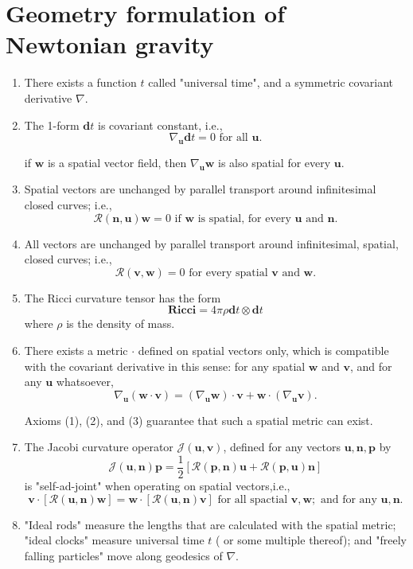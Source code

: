 \section{Geometry formulation of Newtonian gravity}
\begin{enumerate}
\item There exists a function $t$ called "universal time", and a symmetric covariant derivative $\nabla$.
\item The 1-form $\bm{d}t$ is covariant constant, i.e.,
\[\nabla_{\bm{u}} \bm{d}t = 0  \mbox{ for all } \bm{u}.\]
\begin{note}
if $\bm{w}$ is a spatial vector field, then $\nabla_{\bm{u}}\bm{w}$ is also spatial for every $\bm{u}$.
\end{note}
\item Spatial vectors are unchanged by parallel transport around infinitesimal closed curves; i.e.,
\[\mathcal{R}(\bm{n},\bm{u}) \bm{w}=0 \mbox{ if }\bm{w}\mbox{ is spatial, for every } \bm{u} \mbox{ and } \bm{n}.\]
\item All vectors are unchanged by parallel transport around infinitesimal, spatial, closed curves; i.e.,
\[\mathcal{R}(\bm{v},\bm{w}) =0 \mbox{ for every spatial }\bm{v} \mbox{ and } \bm{w}.\]
\item The Ricci curvature tensor has the form
\[\bm{Ricci} = 4 \pi \rho \bm{d}t \otimes \bm{d}t\]
where $\rho$ is the density of mass.
\item There exists a metric $\bm{\cdot}$ defined on spatial vectors only, which is compatible with the covariant derivative in this sense: for any spatial $\bm{w}$ and $\bm{v}$, and for any $\bm{u}$ whatsoever,
\[\nabla_{\bm{u}}(\bm{w} \cdot \bm{v}) = (\nabla_{\bm{u}} \bm{w}) \cdot \bm{v} + \bm{w} \cdot (\nabla_{\bm{u}} \bm{v}).\]
\begin{note}
Axioms (1), (2), and (3) guarantee that such a spatial metric can exist.
\end{note}
\item The Jacobi curvature operator $\mathcal{J}(\bm{u},\bm{v})$, defined for any vectors $\bm{u},\bm{n},\bm{p}$ by
\[\mathcal{J}(\bm{u},\bm{n})\bm{p} = \frac{1}{2}[\mathcal{R}(\bm{p},\bm{n})\bm{u} + \mathcal{R}(\bm{p},\bm{u})\bm{n}]\]
is "self-ad-joint" when operating on spatial vectors,i.e.,
\[\bm{v} \cdot [\mathcal{R}(\bm{u},\bm{n})\bm{w}] = 
\bm{w} \cdot [\mathcal{R}(\bm{u},\bm{n})\bm{v}] \mbox{ for all spactial }\bm{v},\bm{w};\mbox{ and for any }\bm{u},\bm{n}. \]
\item "Ideal rods" measure the lengths that are calculated with the spatial metric; "ideal clocks" measure universal time $t$ ( or some multiple thereof); and "freely falling particles" move along geodesics of $\nabla$.
\end{enumerate}

